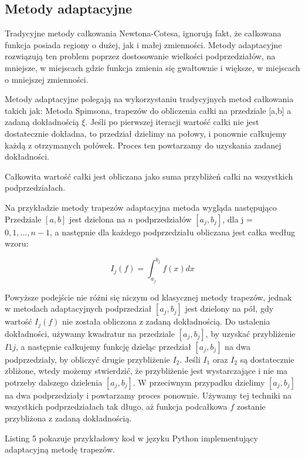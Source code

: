 \documentclass[12pt,twoside]{article}
\begin{document}
\subsection{Metody adaptacyjne}

Tradycyjne metody całkowania Newtona-Cotesa, ignorują fakt, że całkowana funkcja posiada regiony o dużej, jak i małej zmienności.
Metody adaptacyjne rozwiązują ten problem poprzez dostosowanie wielkości podprzedziałów, na mniejsze, w miejscach gdzie funkcja zmienia się gwałtownie i większe, w miejscach o mniejszej zmienności.\cite{adaptive}

Metody adaptacyjne polegają na wykorzystaniu tradycyjnych metod całkowania takich jak: Metoda Spimsona, trapezów do obliczenia całki na przedziale [a,b] a zadaną dokładnością $\xi$. Jeśli po pierwszej iteracji wartość całki nie jest dostatecznie dokładna, to przedział dzielimy na połowy, i ponownie całkujemy każdą z otrzymanych połówek. Proces ten powtarzamy do uzyskania zadanej dokładności.\cite{adaptive2}

Całkowita wartość całki jest obliczana jako suma przybliżeń całki na wszystkich podprzedziałach.

Na przykładzie metody trapezów adaptacyjna metoda wygląda następująco
Przedziale $[a,b]$ jest dzielona na $n$ podprzedziałów $[a_j,b_j]$, dla j = $0,1,...,n-1$, a następnie dla każdego podprzedziału obliczana jest całka według wzoru:

\begin{equation}
I_j(f) = \int_{a_j}^{b_j}f(x) dx
\label{Eq:rownanie}
\end{equation}

Powyższe podejście nie różni się niczym od klasycznej metody trapezów, jednak w metodach adaptacyjnych podprzedział $[a_j,b_j]$ jest dzielony na pół, gdy wartość $I_j(f)$ nie została obliczona z zadaną dokładnością.
Do ustalenia dokładności, używamy kwadratur na przedziale $[a_j,b_j]$, by uzyskać przybliżenie $I1j$, a następnie całkujemy funkcję dzieląc przedział $[a_j,b_j]$ na dwa podprzedziały, by obliczyć drugie przybliżenie $I_2$. Jeśli $I_1$ oraz $I_2$ są dostatecznie zbliżone, wtedy możemy stwierdzić, że przybliżenie jest wystarczające i nie ma potrzeby dalszego dzielenia $[a_j,b_j]$. W przeciwnym przypadku dzielimy $[a_j,b_j]$ na dwa podprzedziały i powtarzamy proces ponownie. Używamy tej techniki na wszystkich podprzedziałach tak długo, aż funkcja podcałkowa $f$ zostanie przybliżona z zadaną dokładnością.\cite{adaptive3}

Listing 5 pokazuje przykładowy kod w języku Python implementujący adaptacyjną metodę trapezów.
\end{document}
